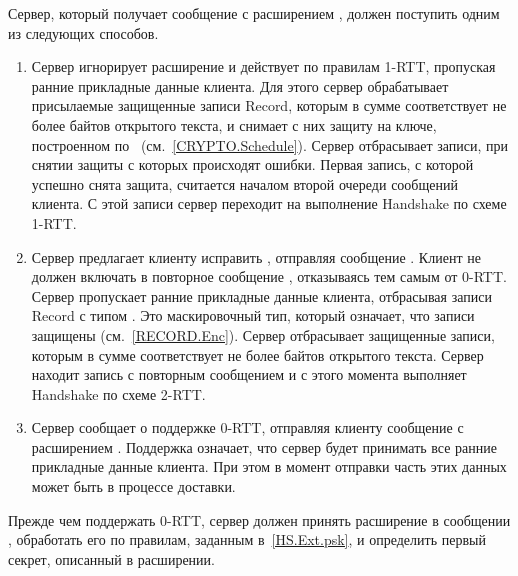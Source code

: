 Сервер, который получает сообщение  с расширением 
, должен поступить одним из следующих способов.

\begin{enumerate}
\item
Сервер игнорирует расширение  и действует по правилам 1-RTT,
пропуская ранние прикладные данные клиента.
%
Для этого сервер обрабатывает присылаемые защищенные записи Record, которым в 
сумме соответствует не более  байтов открытого текста, 
и снимает с них защиту на ключе, построенном
по~ (см.~\ref{CRYPTO.Schedule}).
%
Сервер отбрасывает записи, при снятии защиты с которых происходят ошибки. Первая 
запись, с которой успешно снята защита, считается началом второй очереди 
сообщений клиента.
%
С этой записи сервер переходит на выполнение Handshake по схеме 1-RTT.

\item
Сервер предлагает клиенту исправить , отправляя
сообщение .
%
Клиент не должен включать  в повторное сообщение 
, отказываясь тем самым от 0-RTT.
%
Сервер пропускает ранние прикладные данные клиента, отбрасывая записи Record с типом 
. Это маскировочный тип, который означает, что записи защищены 
(см.~\ref{RECORD.Enc}). Сервер отбрасывает защищенные записи, которым в сумме 
соответствует не более  байтов открытого текста.
%
Сервер находит запись с повторным сообщением  и с 
этого момента выполняет Handshake по схеме 2-RTT.

\item
Сервер сообщает о поддержке 0-RTT, отправляя клиенту сообщение 
 с расширением .
%
Поддержка означает, что сервер будет принимать все ранние прикладные данные 
клиента. При этом в момент отправки  часть 
этих данных может быть в процессе доставки.
\end{enumerate}

Прежде чем поддержать 0-RTT, сервер должен принять расширение 
 в сообщении ,
обработать его по правилам, заданным в~\ref{HS.Ext.psk}, и определить первый 
секрет, описанный в расширении.


